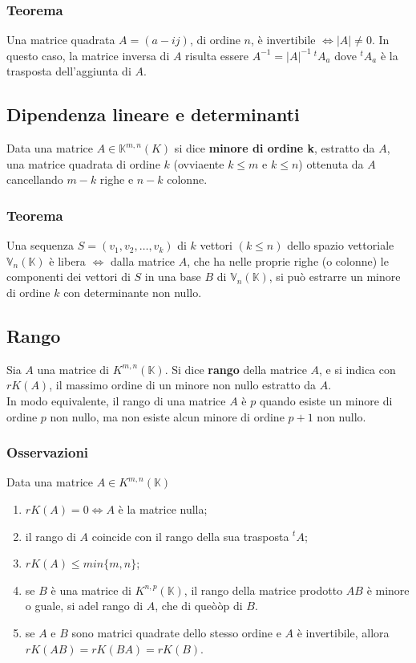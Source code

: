 \documentclass{article}
\newcommand{\s}[2]{#1_1, #1_2, \ldots, #1_{#2}}
\newcommand{\Vx}[1]{\mathbb{V}_#1 (\mathbb{K})}
\begin{document}
\subsubsection{Teorema}
Una matrice quadrata $A = (a-{ij})$, di ordine $n$, è invertibile
$\iff|A|\ne0$. In questo caso, la matrice inversa di $A$ risulta essere
$A^{-1}=|A|^{-1}\ {^{t}A_a}$ dove ${^{t}A_a}$ è la trasposta dell'aggiunta di
$A$.

\subsection{Dipendenza lineare e determinanti}
Data una matrice $A\in{\mathbb{K}^{m,n}} (K)$ si dice \textbf{minore di ordine
    k}, estratto da $A$, una matrice quadrata di ordine $k$ (ovviaente $k\leq{m}$ e
$k\leq{n}$) ottenuta da $A$ cancellando $m-k$ righe e $n-k$ colonne.\\

\subsubsection{Teorema}
Una sequenza $S = (\s{v}{k})$ di $k$ vettori $ (k\leq{n})$ dello spazio
vettoriale $\Vx{n}$ è libera $\iff$ dalla matrice $A$, che ha nelle proprie
righe (o colonne) le componenti dei vettori di $S$ in una base $B$ di $\Vx{n}$,
si può estrarre un minore di ordine $k$ con determinante non nullo.

\subsection{Rango}
Sia $A$ una matrice di $K^{m,n} (\mathbb{K})$. Si dice \textbf{rango} della
matrice $A$, e si indica con $rK (A)$, il massimo ordine di un minore non nullo
estratto da $A$.\\ In modo equivalente, il rango di una matrice $A$ è $p$
quando esiste un minore di ordine $p$ non nullo, ma non esiste alcun minore di
ordine $p+1$ non nullo.\\

\subsubsection{Osservazioni}
Data una matrice $A \in K^{m,n} (\mathbb{K})$
\begin{enumerate}
    \item $rK (A) = 0\iff{} A$ è la matrice nulla;
    \item il rango di $A$ coincide con il rango della sua trasposta ${^{t}A}$;
    \item $rK (A) \leq min\{m,n\}$;
    \item se $B$ è una matrice di $K^{n,p} (\mathbb{K})$, il rango della matrice prodotto
          $AB$ è minore o guale, si adel rango di $A$, che di queòòp di $B$.
    \item se $A$ e $B$ sono matrici quadrate dello stesso ordine e $A$ è invertibile,
          allora $rK (AB) = rK (BA) = rK (B)$.
\end{enumerate}
\end{document}
